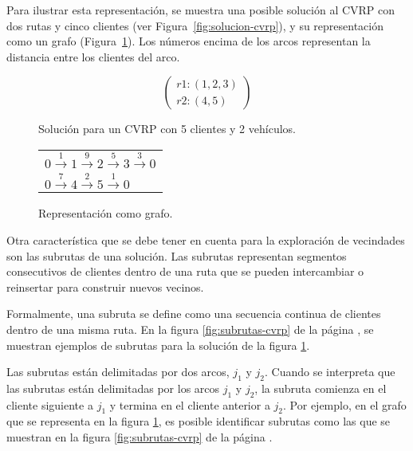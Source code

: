 \documentclass[12pt]{report}
\begin{document}
	Para ilustrar esta representación, se muestra una posible solución al CVRP con dos rutas y cinco clientes (ver Figura~\ref{fig:solucion-cvrp}), y su representación como un grafo (Figura~\ref{fig:grafo-cvrp}). Los números encima de los arcos representan la distancia entre los clientes del arco.

	\begin{figure}[h!]
		\begin{minipage}{0.45\textwidth}
			\centering
			\[
			\left(
			\begin{array}{l}
				r1: (1,2,3) \\
				r2: (4,5)
			\end{array}
			\right)
			\]
			\caption{Solución para un CVRP con 5 clientes y 2 vehículos.}
			\label{fig:solucion-cvrp}
		\end{minipage}
		\hfill
		\begin{minipage}{0.45\textwidth}
			\centering
			\begin{tabular}{l}
				$0 \overset{1}{\rightarrow}1 \overset{9}{\rightarrow}2 \overset{5}{\rightarrow}3 \overset{3}{\rightarrow}0$\\
				$0 \overset{7}{\rightarrow}4 \overset{2}{\rightarrow}5 \overset{1}{\rightarrow}0$
			\end{tabular}
			\caption{Representación como grafo.}
			\label{fig:grafo-cvrp}
		\end{minipage}
	\end{figure}

	Otra característica que se debe tener en cuenta para la exploración de vecindades son las subrutas de una solución. Las subrutas representan segmentos consecutivos de clientes dentro de una ruta que se pueden intercambiar o reinsertar para construir nuevos vecinos.

	Formalmente, una subruta se define como una secuencia continua de clientes dentro de una misma ruta. En la figura \ref{fig:subrutas-cvrp} de la página \pageref{fig:subrutas-cvrp}, se muestran ejemplos de subrutas para la solución de la figura \ref{fig:grafo-cvrp}.

	Las subrutas están delimitadas por dos arcos, $j_1$ y $j_2$. Cuando se interpreta que las subrutas están delimitadas por los arcos $j_1$ y $j_2$, la subruta comienza en el cliente siguiente a $j_1$ y termina en el cliente anterior a $j_2$. Por ejemplo, en el grafo que se representa en la figura \ref{fig:grafo-cvrp}, es posible identificar subrutas como las que se muestran en la figura \ref{fig:subrutas-cvrp} de la página \pageref{fig:subrutas-cvrp}.
\end{document}
